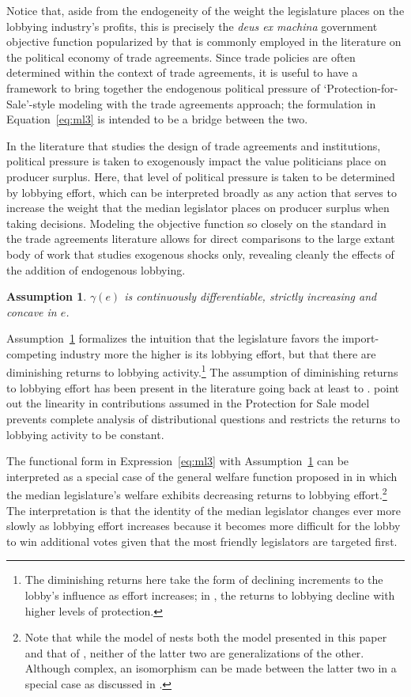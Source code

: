 \documentclass[authoryear, review]{elsarticle}
\newtheorem{assumption}{Assumption}
\newcommand{\ga}{\gamma}
\begin{document}
Notice that, aside from the endogeneity of the weight the legislature places on the lobbying industry's profits, this is precisely the \textit{deus ex machina} government objective function popularized by \citet{baldwin} that is commonly employed in the literature on the political economy of trade agreements. Since trade policies are often determined within the context of trade agreements, it is useful to have a framework to bring together the endogenous political pressure of `Protection-for-Sale'-style modeling with the trade agreements approach; the formulation in Equation~\ref{eq:ml3} is intended to be a bridge between the two. 

In the literature that studies the design of trade agreements and institutions, political pressure is taken to exogenously impact the value politicians place on producer surplus. Here, that level of political pressure is taken to be determined by lobbying effort, which can be interpreted broadly as any action that serves to increase the weight that the median legislator places on producer surplus when taking decisions. Modeling the objective function so closely on the standard in the trade agreements literature allows for direct comparisons to the large extant body of work that studies exogenous shocks only, revealing cleanly the effects of the addition of endogenous lobbying.

\begin{assumption}
  $\ga(e)$ is continuously differentiable, strictly increasing and concave in $e$.
  \label{as:ga_c3}
\end{assumption}

Assumption~\ref{as:ga_c3} formalizes the intuition that the legislature favors the import-competing industry more the higher is its lobbying effort, but that there are diminishing returns to lobbying activity.\footnote{The diminishing returns here take the form of declining increments to the lobby's influence as effort increases; in \citet{ethier2012}, the returns to lobbying decline with higher levels of protection.} The assumption of diminishing returns to lobbying effort has been present in the literature going back at least to \citet{fw}. \citet{dgh97} point out the linearity in contributions assumed in the Protection for Sale model prevents complete analysis of distributional questions and restricts the returns to lobbying activity to be constant.

The functional form in Expression~\ref{eq:ml3} with Assumption~\ref{as:ga_c3} can be interpreted as a special case of the general welfare function proposed in \citet{dgh97} in which the median legislature's welfare exhibits decreasing returns to lobbying effort.\footnote{Note that while the model of \citet{dgh97} nests both the model presented in this paper and that of \citet{gh94}, neither of the latter two are generalizations of the other. Although complex, an isomorphism can be made between the latter two in a special case as discussed in \citet{buzard2013b}.\label{fn:dghpfs}} The interpretation is that the identity of the median legislator changes ever more slowly as lobbying effort increases because it becomes more difficult for the lobby to win additional votes given that the most friendly legislators are targeted first.
\end{document}
